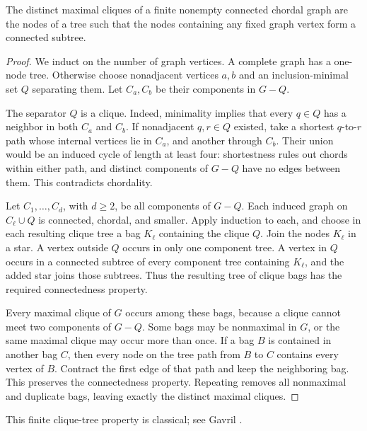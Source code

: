 \begin{lemma}\label{lemma:a:3.1}

The distinct maximal cliques of a finite nonempty connected chordal graph are
the nodes of a tree such that the nodes containing any fixed graph vertex
form a connected subtree.

\end{lemma}
\begin{proof}

We induct on the number of graph vertices. A complete graph has a one-node
tree. Otherwise choose nonadjacent vertices \(a,b\) and an inclusion-minimal
set \(Q\) separating them. Let \(C_a,C_b\) be their components in
\(G-Q\).

The separator \(Q\) is a clique. Indeed, minimality implies that every
\(q\in Q\) has a neighbor in both \(C_a\) and \(C_b\). If nonadjacent
\(q,r\in Q\) existed, take a shortest \(q\)-to-\(r\) path whose internal
vertices lie in \(C_a\), and another through \(C_b\). Their union would be
an induced cycle of length at least four: shortestness rules out chords
within either path, and distinct components of \(G-Q\) have no edges between
them. This contradicts chordality.

Let \(C_1,\ldots,C_d\), with \(d\ge2\), be all components of \(G-Q\).
Each induced graph on \(C_\ell\cup Q\) is connected, chordal, and smaller.
Apply induction to each, and choose in each resulting clique tree a bag
\(K_\ell\) containing the clique \(Q\). Join the nodes \(K_\ell\) in a
star. A vertex outside \(Q\) occurs in only one component tree. A vertex in
\(Q\) occurs in a connected subtree of every component tree containing
\(K_\ell\), and the added star joins those subtrees. Thus the resulting tree
of clique bags has the required connectedness property.

Every maximal clique of \(G\) occurs among these bags, because a clique cannot
meet two components of \(G-Q\). Some bags may be nonmaximal in \(G\), or the
same maximal clique may occur more than once. If a bag \(B\) is contained in
another bag \(C\), then every node on the tree path from \(B\) to \(C\)
contains every vertex of \(B\). Contract the first edge of that path and keep
the neighboring bag. This preserves the connectedness property. Repeating
removes all nonmaximal and duplicate bags, leaving exactly the distinct
maximal cliques.
\end{proof}

This finite clique-tree property is classical; see Gavril \cite{G}.

